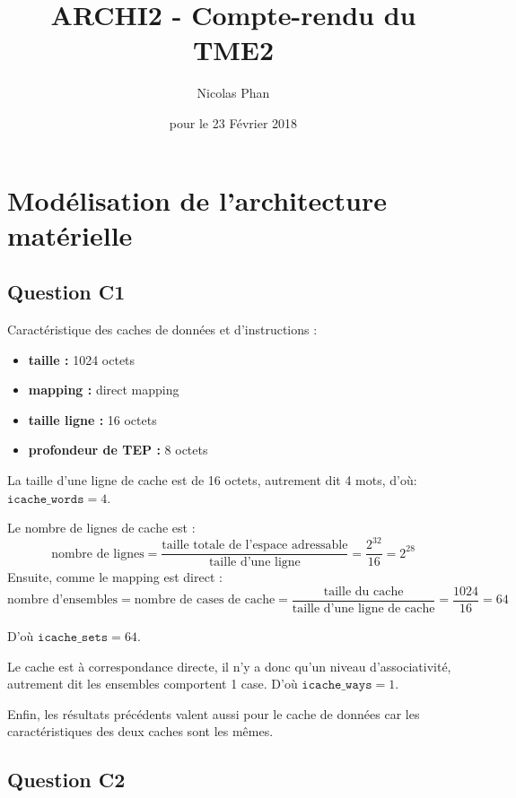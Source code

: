 \documentclass{article}
\title{ARCHI2 - Compte-rendu du TME2}
\author{Nicolas Phan}
\date{pour le 23 Février 2018}
\begin{document}
\pagestyle{headings}
\maketitle
\tableofcontents
\newpage



\section{Modélisation de l'architecture matérielle}

\subsection{Question C1}
 
Caractéristique des caches de données et d'instructions :
\begin{itemize}
 \item \textbf{taille :} 1024 octets
 \item \textbf{mapping :} direct mapping
 \item \textbf{taille ligne :} 16 octets
 \item \textbf{profondeur de TEP :} 8 octets
\end{itemize}

La taille d'une ligne de cache est de 16 octets, autrement dit 4 mots, d'où:
$\texttt{icache\_words} = 4$.

Le nombre de lignes de cache est :
\[ \text{nombre de lignes} =
   \frac{\text{taille totale de l'espace adressable}}
	{\text{taille d'une ligne}}
    = \frac{2^{32}}{16} = 2^{28} 
\]
Ensuite, comme le mapping est direct :
\[ \text{nombre d'ensembles} = \text{nombre de cases de cache}
  = \frac{\text{taille du cache}}{\text{taille d'une ligne de cache}}
  = \frac{1024}{16}
  = 64 \]

D'où $\texttt{icache\_sets} = 64$.

Le cache est à correspondance directe, il n'y a donc qu'un niveau
d'associativité, autrement dit les ensembles comportent 1 case.
D'où $\texttt{icache\_ways} = 1$.

Enfin, les résultats précédents valent aussi pour le cache de données car
les caractéristiques des deux caches sont les mêmes.

\subsection{Question C2}
\end{document}

